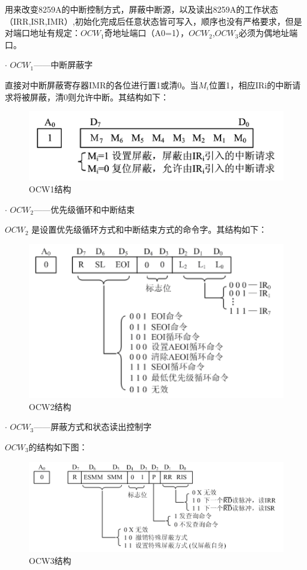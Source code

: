 \documentclass[UTF8,12pt]{ctexart}
\begin{document}
    用来改变8259A的中断控制方式，屏蔽中断源，以及读出8259A的工作状态（IRR,ISR,IMR）,初始化完成后任意状态皆可写入，顺序也没有严格要求，但是对端口地址有规定：$OCW_1$奇地址端口（A0=1），$OCW_2$,$OCW_3$必须为偶地址端口。
    
    $\cdot$ $OCW_1$——中断屏蔽字
    
    直接对中断屏蔽寄存器IMR的各位进行置1或清0。当$M_i$位置1，相应IRi的中断请求将被屏蔽，清0则允许中断。其结构如下：
    
    \begin{figure}[H]
        \centering
        \includegraphics[width=12cm]{images/OCW1.png}
        \caption{OCW1结构}
        \label{OCW1}
    \end{figure}
    
    $\cdot$ $OCW_2$——优先级循环和中断结束
    
    $OCW_2$ 是设置优先级循环方式和中断结束方式的命令字。其结构如下：
    \begin{figure}[H]
        \centering
        \includegraphics[width=12cm]{images/OCW2.png}
        \caption{OCW2结构}
        \label{OCW2}
    \end{figure}
    
    $\cdot$ $OCW_3$——屏蔽方式和状态读出控制字
    
    $OCW_3$的结构如下图：
    \begin{figure}[H]
        \centering
        \includegraphics[width=12cm]{images/OCW3.png}
        \caption{OCW3结构}
        \label{OCW3}
    \end{figure}
    
\end{document}

